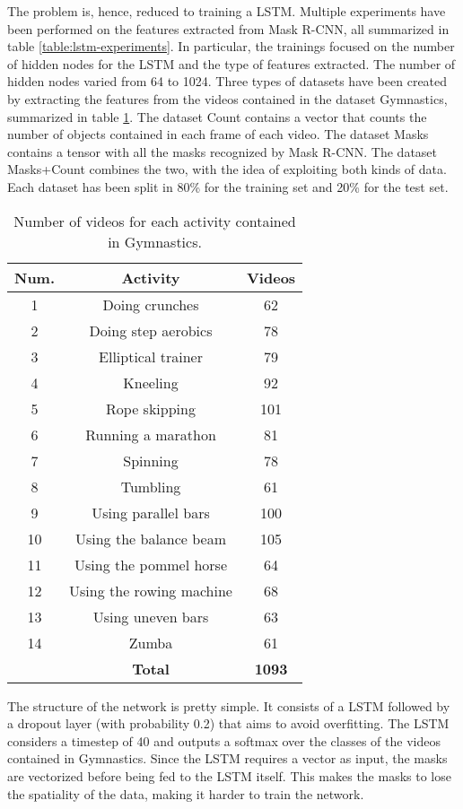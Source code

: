 \documentclass[12pt]{article}
\numberwithin{equation}{section} %
\numberwithin{figure}{section} %
\numberwithin{table}{section} %
\theoremstyle{definition}
\begin{document}
The problem is, hence, reduced to training a LSTM. Multiple
experiments have been performed on the features extracted
from Mask R-CNN, all summarized in table
\ref{table:lstm-experiments}. In particular, the trainings
focused on the number of hidden nodes for the LSTM and the
type of features extracted. The number of hidden nodes
varied from 64 to 1024. Three types of datasets have
been created by extracting the features from the videos
contained in the dataset Gymnastics, summarized in table
\ref{table:activity-dataset}.
The dataset Count contains a vector
that counts the number of objects contained in each frame of
each video. The dataset Masks contains a tensor with all the
masks recognized by Mask R-CNN. The dataset Masks+Count
combines the two, with the idea of exploiting both kinds
of data. Each dataset has been split in 80\% for the training
set and 20\% for the test set.

\begin{table}
	\centering
	\begin{tabular}{*{3}{c}}
		Num. & Activity & Videos \\
		\hline
		1 & Doing crunches & 62 \\
		2 & Doing step aerobics & 78 \\
		3 & Elliptical trainer & 79 \\
		4 & Kneeling & 92 \\
		5 & Rope skipping & 101 \\
		6 & Running a marathon & 81 \\
		7 & Spinning & 78 \\
		8 & Tumbling & 61 \\
		9 & Using parallel bars & 100 \\
		10 & Using the balance beam & 105 \\
		11 & Using the pommel horse & 64 \\
		12 & Using the rowing machine & 68 \\
		13 & Using uneven bars & 63 \\
		14 & Zumba & 61 \\
		\hline
		& \textbf{Total} & \textbf{1093}
	\end{tabular}
	\caption{Number of videos for each activity contained in Gymnastics.}
	\label{table:activity-dataset}
\end{table}

The structure of the network is pretty simple. It consists
of a LSTM followed by a dropout layer (with probability 0.2)
that aims to avoid overfitting. The LSTM considers a timestep
of 40 and outputs a softmax over the classes of the videos
contained in Gymnastics. Since the LSTM requires a vector
as input, the masks are vectorized before being fed to the
LSTM itself. This makes the masks to lose the spatiality
of the data, making it harder to train the network.
\end{document}
